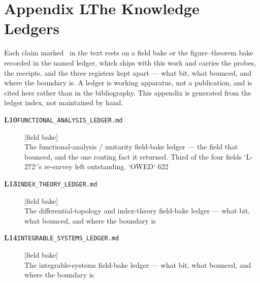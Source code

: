 \clearpage
\section*{Appendix L\quad The Knowledge Ledgers}\label{app:ledgers}
\small\noindent Each claim marked \ldgmarker\ in the text rests on a field bake or the figure--theorem bake recorded in the named ledger, which ships with this work and carries the probes, the receipts, and the three registers kept apart --- what bit, what bounced, and where the boundary is. A ledger is working apparatus, not a publication, and is cited here rather than in the bibliography. This appendix is generated from the ledger index, not maintained by hand.\par\medskip
\begingroup\renewcommand{\arraystretch}{1.25}
\begin{description}
\item[\textbf{L10}\quad\texttt{FUNCTIONAL\_ANALYSIS\_LEDGER.md}]\hfill\textsf{[field bake]}\\
The functional-analysis / unitarity field-bake ledger --- the field that bounced, and the one routing fact it returned. Third of the four fields `L-272`'s re-survey left outstanding. `OWED` 622
\item[\textbf{L13}\quad\texttt{INDEX\_THEORY\_LEDGER.md}]\hfill\textsf{[field bake]}\\
The differential-topology and index-theory field-bake ledger --- what bit, what bounced, and where the boundary is
\item[\textbf{L14}\quad\texttt{INTEGRABLE\_SYSTEMS\_LEDGER.md}]\hfill\textsf{[field bake]}\\
The integrable-systems field-bake ledger --- what bit, what bounced, and where the boundary is
\end{description}
\endgroup
